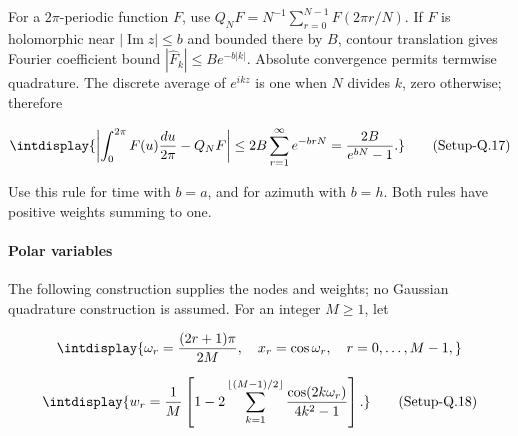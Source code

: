 For a \(2\pi\)-periodic function \(F\), use \(Q_NF=N^{-1}\sum_{r=0}^{N-1}F(2\pi r/N)\). If \(F\) is holomorphic near \(|\operatorname{Im}z|\le b\) and bounded there by \(B\), contour translation gives Fourier coefficient bound \(|\widehat F_k|\le Be^{-b|k|}\). Absolute convergence permits termwise quadrature. The discrete average of \(e^{ikz}\) is one when \(N\) divides \(k\), zero otherwise; therefore


\label{int:eq-setup-q-17}
\begingroup\renewcommand{\theHequation}{intdisplay.885}
\begin{equation}
\intdisplay{
\left|\int_0^{2\pi}F(u)\frac{du}{2\pi}-Q_NF\right|
\le2B\sum_{r=1}^{\infty}e^{-brN}
=\frac{2B}{e^{bN}-1}.
}
\tag{Setup-Q.17}
\label{int:eq-0438-setup-q-17}
\end{equation}
\endgroup


Use this rule for time with \(b=a\), and for azimuth with \(b=h\). Both rules have positive weights summing to one.


\paragraph{Polar variables}

\mbox{}\par\smallskip


The following construction supplies the nodes and weights; no Gaussian quadrature construction is assumed. For an integer \(M\ge1\), let


\begingroup\renewcommand{\theHequation}{intdisplay.886}
\begin{equation*}
\intdisplay{
\omega_r=\frac{(2r+1)\pi}{2M},\quad x_r=\cos\omega_r,
\quad r=0,\ldots,M-1,
}
\end{equation*}
\endgroup

\label{int:eq-setup-q-18}
\begingroup\renewcommand{\theHequation}{intdisplay.887}
\begin{equation}
\intdisplay{
w_r=\frac1M\left[
1-2\sum_{k=1}^{\lfloor(M-1)/2\rfloor}
\frac{\cos(2k\omega_r)}{4k^2-1}\right].
}
\tag{Setup-Q.18}
\label{int:eq-0439-setup-q-18}
\end{equation}
\endgroup


